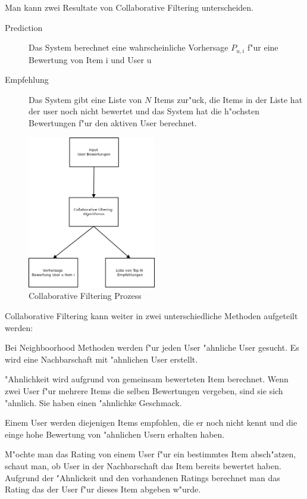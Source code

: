 \documentclass[a4paper, 12pt]{article}
\begin{document}
Man kann zwei Resultate von Collaborative Filtering unterscheiden.

\begin{description}
\item[Prediction] Das System berechnet eine wahrscheinliche Vorhersage $P_{u,i}$ f"ur eine Bewertung von Item i und User u
\item[Empfehlung] Das System gibt eine Liste von $N$ Items zur"uck, die Items in der Liste hat der user noch nicht bewertet und das System hat die h"ochsten Bewertungen f"ur den aktiven User berechnet.
\end{description}

\begin{figure}
  \centering
      \includegraphics[width=0.5\textwidth]{cf}
  \caption{Collaborative Filtering Prozess}
\end{figure}

Collaborative Filtering kann weiter in zwei unterschiedliche Methoden aufgeteilt werden:

Bei Neighboorhood Methoden werden f"ur jeden User "ahnliche User gesucht. Es wird eine Nachbarschaft mit "ahnlichen User erstellt.

"Ahnlichkeit wird aufgrund von gemeinsam bewerteten Item berechnet. Wenn zwei User f"ur mehrere Items die selben Bewertungen vergeben, sind sie sich "ahnlich. Sie haben einen "ahnlichke Geschmack.

Einem User werden diejenigen Items empfohlen, die er noch nicht kennt und die einge hohe Bewertung von "ahnlichen Usern erhalten haben.

 M"ochte man das Rating von einem User f"ur ein bestimmtes Item ab\-sch"atz\-en, schaut man, ob User in der Nachbarschaft das Item bereits bewertet haben. Aufgrund der "Ahnlickeit und den vorhandenen Ratings berechnet man das Rating das der User f"ur dieses Item abgeben w"urde.
\end{document}
